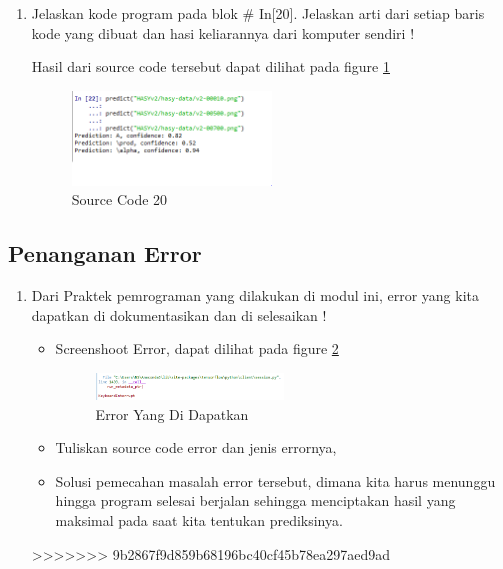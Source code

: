 \begin{enumerate}
\item Jelaskan kode program pada blok \# In[20]. Jelaskan arti dari setiap baris kode yang dibuat dan hasi keliarannya dari komputer sendiri !
	
	\subitem Hasil dari source code tersebut dapat dilihat pada figure \ref{YNC7-28}
	\begin{figure}[!htbp!]
		\centerline{\includegraphics[width=0.5\textwidth]{figures/YN/Chapter7/YNC7-28.png}}
		\caption{Source Code 20}
		\label{YNC7-28}
	\end{figure}

\end{enumerate}

\subsection{Penanganan Error}
\begin{enumerate}

\item Dari Praktek pemrograman yang dilakukan di modul ini, error yang kita dapatkan di dokumentasikan dan di selesaikan !
	\begin{itemize}

	\item Screenshoot Error, dapat dilihat pada figure \ref{YNC7-29}
	
	\begin{figure}[!htbp!]
		\centerline{\includegraphics[width=0.5\textwidth]{figures/YN/Chapter7/YNC7-29.png}}
		\caption{Error Yang Di Dapatkan}
		\label{YNC7-29}
	\end{figure}

	\item Tuliskan source code error dan jenis errornya,
	

	\item Solusi pemecahan masalah error tersebut, dimana kita harus menunggu hingga program selesai berjalan sehingga menciptakan hasil yang maksimal pada saat kita tentukan prediksinya.
		
	\end{itemize}

>>>>>>> 9b2867f9d859b68196bc40cf45b78ea297aed9ad
\end{enumerate}